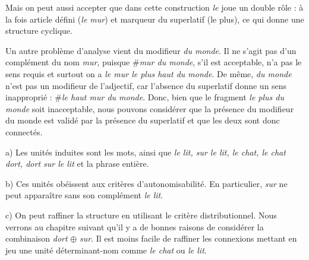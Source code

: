 {Mais on peut aussi accepter que dans cette construction \textit{le} joue un double rôle : à la fois article défini (\textit{le mur}) et marqueur du superlatif (le plus), ce qui donne une structure cyclique.

\hfill{}\hfill{}



Un autre problème d’analyse vient du modifieur \textit{du monde}. Il ne s’agit pas d’un complément du nom \textit{mur}, puisque \#\textit{mur du monde}, s’il est acceptable, n’a pas le sens requis et surtout on a \textit{le mur le plus haut du monde}. De même, \textit{du monde} n’est pas un modifieur de l’adjectif, car l’absence du superlatif donne un sens inapproprié : \#\textit{le haut mur du monde}. Donc, bien que le fragment \textit{le plus du monde} soit inacceptable, nous pouvons considérer que la présence du modifieur du monde est validé par la présence du superlatif et que les deux sont donc connectés.

 a) Les unités induites sont les mots, ainsi que \textit{le lit, sur le lit, le chat, le chat dort, dort sur le lit} et la phrase entière.

b) Ces unités obéissent aux critères d’autonomisabilité. En particulier, \textit{sur} ne peut apparaître sans son complément \textit{le lit}.

c) On peut raffiner la structure en utilisant le critère distributionnel. Nous verrons au chapitre suivant qu’il y a de bonnes raisons de considérer la combinaison \textit{dort} \textrm{${\oplus}$} \textit{sur}. Il est moins facile de raffiner les connexions mettant en jeu une unité déterminant-nom comme \textit{le chat} ou \textit{le lit}.
}
